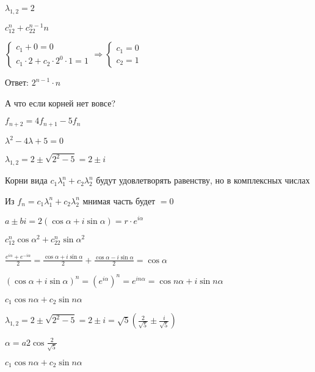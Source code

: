 \documentclass[14pt, letter paper]{article}
\begin{document}
$\lambda_{1,2} = 2$

$c_12^n + c_22^{n-1}n$

$\begin{cases}
    c_1 + 0 = 0 \\

    c_1\cdot 2 + c_2 \cdot 2^0 \cdot 1 = 1
\end{cases} \Rightarrow \begin{cases}
    c_1 = 0 \\
    c_2 = 1
\end{cases}$

Ответ: $2^{n-1} \cdot n$

\vspace{5mm}

А что если корней нет вовсе?

$f_{n+2} = 4f_{n+1} - 5f_n$

$\lambda^2 - 4\lambda + 5 = 0$

$\lambda_{1,2} = 2 \pm \sqrt{2^2 - 5} = 2 \pm i$

Корни вида $c_1\lambda_1^n + c_2\lambda_2^n$ будут удовлетворять равенству, но в комплексных числах

Из $f_n = c_1\lambda_1^n + c_2\lambda_2^n$ мнимая часть будет $= 0$

\vspace{5mm}

$a \pm bi = 2(\cos{\alpha} + i\sin{\alpha}) = r \cdot e^{i\alpha}$

$c_12^n \cos{\alpha}^2 + c_22^n\sin{\alpha}^2$

\vspace{5mm}

$\frac{e^{i\alpha} + e^{-i\alpha}}{2} = \frac{\cos{\alpha} + i\sin{\alpha}}{2} + \frac{\cos{\alpha} - i\sin{\alpha}}{2} = \cos{\alpha}$

\vspace{5mm}

$(\cos{\alpha} + i\sin{\alpha})^n = (e^{i\alpha})^n = e^{in\alpha} = \cos{n\alpha} + i\sin{n\alpha}$

\vspace{5mm}

$c_1\cos{n\alpha} + c_2\sin{n\alpha}$

$\lambda_{1,2} = 2 \pm \sqrt{2^2 - 5} = 2 \pm i = \sqrt{5}(\frac{2}{\sqrt{5}} \pm \frac{i}{\sqrt{5}})$

$\alpha = a2\cos{\frac{2}{\sqrt{5}}}$

$c_1\cos{n\alpha} + c_2\sin{n\alpha}$

\vspace{5mm}
\end{document}

